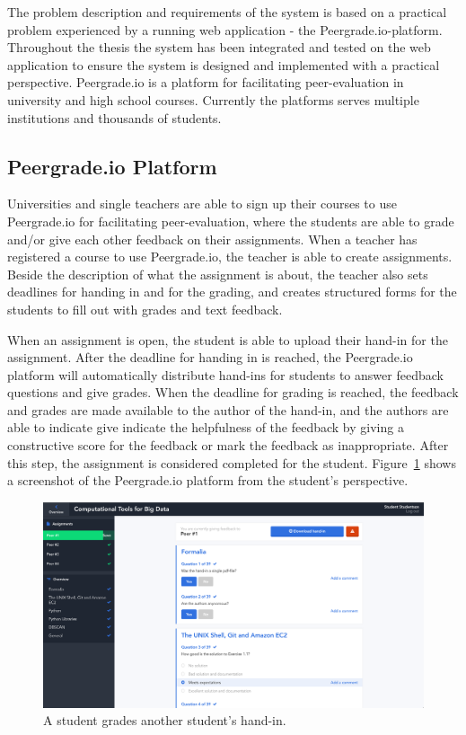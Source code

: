 The problem description and requirements of the system is based on a practical problem experienced by a running web application - the Peergrade.io-platform. Throughout the thesis the system has been integrated and tested on the web application to ensure the system is designed and implemented with a practical perspective. Peergrade.io is a platform for facilitating peer-evaluation in university and high school courses. Currently the platforms serves multiple institutions and thousands of students.

\subsection{Peergrade.io Platform}
\label{subsec:the-peergrade-io-platform}

Universities and single teachers are able to sign up their courses to use Peergrade.io for facilitating peer-evaluation, where the students are able to grade and/or give each other feedback on their assignments. When a teacher has registered a course to use Peergrade.io, the teacher is able to create assignments. Beside the description of what the assignment is about, the teacher also sets deadlines for handing in and for the grading, and creates structured forms for the students to fill out with grades and text feedback.

When an assignment is open, the student is able to upload their hand-in for the assignment. After the deadline for handing in is reached, the Peergrade.io platform will automatically distribute hand-ins for students to answer feedback questions and give grades. When the deadline for grading is reached, the feedback and grades are made available to the author of the hand-in, and the authors are able to indicate give indicate the helpfulness of the feedback by giving a constructive score for the feedback or mark the feedback as inappropriate. After this step, the assignment is considered completed for the student. Figure~\ref{fig:student-screenshot} shows a screenshot of the Peergrade.io platform from the student's perspective.

\begin{figure}[ht!]
  \includegraphics[width=\textwidth]{figures/screenshots/student_give_feedback.png}
  \caption[Screenshot from Peergrade.io]{A student grades another student's hand-in.}
  \label{fig:student-screenshot}
\end{figure}

